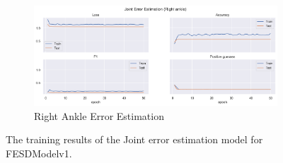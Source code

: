\begin{figure}[!ht]
\begin{subfigure}[b]{0.47\linewidth}
      \label{fig:v1_lean_jt_ee}
  \end{subfigure}
  \hfill
  \begin{subfigure}[b]{0.47\linewidth}
      \centering
      \includegraphics[width=\textwidth]{figures/Results/v1/jt/Right ankle_ErrorEstimation.png}
      \caption{Right Ankle Error Estimation}
      \label{fig:v1_rian_jt_ee}
  \end{subfigure}
  \caption[Detailed Training results for FESDModelv2]{The training results of the Joint error estimation model for FESDModelv1.}
\end{figure}